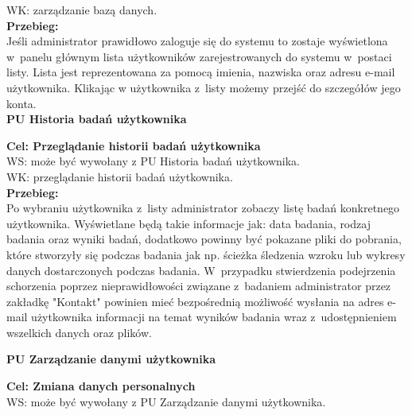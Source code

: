 \documentclass[12pt, letterpaper]{article}
\begin{document}
		WK: zarządzanie bazą danych. \\
		
		\textbf{Przebieg:}\\
		Jeśli administrator prawidłowo zaloguje się do systemu to zostaje wyświetlona w~panelu głównym lista użytkowników zarejestrowanych do systemu w~postaci listy. Lista jest reprezentowana za pomocą imienia, nazwiska oraz adresu e-mail użytkownika. Klikając w użytkownika z~listy możemy przejść do szczegółów jego konta.\\	
		
		
		\textbf{PU Historia badań użytkownika}
		
		\quad
		
		\textbf{Cel: Przeglądanie historii badań użytkownika}\\
		
		WS: może być wywołany z PU Historia badań użytkownika.\\
		
		WK: przeglądanie historii badań użytkownika. \\
		
		\textbf{Przebieg:}\\
		Po wybraniu użytkownika z~listy administrator zobaczy listę badań konkretnego użytkownika. Wyświetlane będą takie informacje jak: data badania, rodzaj badania oraz wyniki badań, dodatkowo powinny być pokazane pliki do pobrania, które stworzyły się podczas badania jak np. ścieżka śledzenia wzroku lub wykresy danych dostarczonych podczas badania. W~przypadku stwierdzenia podejrzenia schorzenia poprzez nieprawidłowości związane z~badaniem administrator przez zakładkę "Kontakt" powinien mieć bezpośrednią możliwość wysłania na adres e-mail użytkownika informacji na temat wyników badania wraz z~udostępnieniem wszelkich danych oraz plików.
		
		
		\newpage		
		
		\textbf{PU Zarządzanie danymi użytkownika}
		
		\quad
		
		\textbf{Cel: Zmiana danych personalnych}\\
		
		WS: może być wywołany z PU Zarządzanie danymi użytkownika.\\
		
\end{document}
